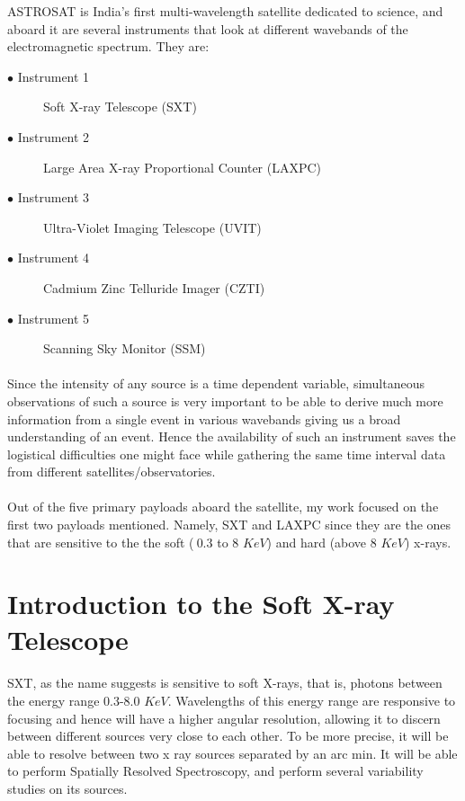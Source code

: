 \documentclass[a4paper,twoside]{report}
\numberwithin{equation}{section}
\begin{document}
ASTROSAT is India's first multi-wavelength satellite dedicated to science, and aboard it are several instruments that look at different wavebands of the electromagnetic spectrum. They are:
\begin{description}
  \item[$\bullet$ Instrument 1] Soft X-ray Telescope (SXT)
  \item[$\bullet$ Instrument 2] Large Area X-ray Proportional Counter (LAXPC)
  \item[$\bullet$ Instrument 3] Ultra-Violet Imaging Telescope (UVIT)
  \item[$\bullet$ Instrument 4] Cadmium Zinc Telluride Imager (CZTI)
  \item[$\bullet$ Instrument 5] Scanning Sky Monitor (SSM)
\end{description}
\paragraph{}
Since the intensity of any source is a time dependent variable, simultaneous observations of such a source is very important to be able to derive much more information from a single event in various wavebands giving us a broad understanding of an event. Hence the availability of such an instrument saves the logistical difficulties one might face while gathering the same time interval data from different satellites/observatories. 
\paragraph{}
Out of the five primary payloads aboard the satellite, my work focused on the first two payloads mentioned. Namely, SXT and LAXPC since they are the ones that are sensitive to the the soft ($~0.3$ to $8$ $KeV$) and hard (above $8$ $KeV$) x-rays.
\section{Introduction to the Soft X-ray Telescope}
\paragraph{}
SXT, as the name suggests is sensitive to soft X-rays, that is, photons between the energy range $0.3$-$8.0$ $KeV$. Wavelengths of this energy range are responsive to focusing and hence will have a higher angular resolution, allowing it to discern between different sources very close to each other. To be more precise, it will be able to resolve between two x ray sources separated by an arc min. It will be able to perform Spatially Resolved Spectroscopy, and perform several variability studies on its sources.
\end{document}

